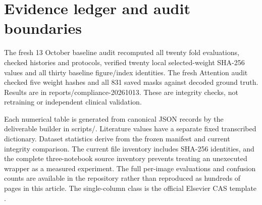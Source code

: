 \documentclass[a4paper,fleqn]{cas-sc}
\begin{document}
\section{Evidence ledger and audit boundaries}
The fresh 13 October baseline audit recomputed all twenty fold evaluations, checked histories and protocols, verified twenty local selected-weight SHA-256 values and all thirty baseline figure/index identities. The fresh Attention audit checked five weight hashes and all 831 saved masks against decoded ground truth. Results are in reports/compliance-20261013. These are integrity checks, not retraining or independent clinical validation.

Each numerical table is generated from canonical JSON records by the deliverable builder in scripts/. Literature values have a separate fixed transcribed dictionary. Dataset statistics derive from the frozen manifest and current integrity comparison. The current file inventory includes SHA-256 identities, and the complete three-notebook source inventory prevents treating an unexecuted wrapper as a measured experiment. The full per-image evaluations and confusion counts are available in the repository rather than reproduced as hundreds of pages in this article. The single-column class is the official Elsevier CAS template \cite{kastemplates}.


\end{document}
